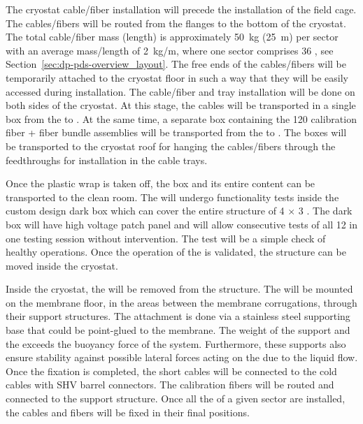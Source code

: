 The cryostat cable/fiber installation will precede the installation of the field cage. The cables/fibers will be routed from the flanges to the bottom of the cryostat. The total cable/fiber mass (length) is approximately \SI{50}{\kg} (\SI{25}{\m}) per sector with an average mass/length of \SI{2}{\kg/\m}, where one sector comprises \num{36} , see Section~\ref{sec:dp-pds-overview_layout}. The free ends of the cables/fibers will be temporarily attached to the cryostat floor in such a way that they will be easily accessed during installation. The cable/fiber and tray installation will be done on both sides of the cryostat. At this stage, the  cables will be transported in a single box from the  to \surf. At the same time, a separate box containing the \num{120} calibration fiber + fiber bundle assemblies will be transported from the  to \surf. The boxes will be transported to the cryostat roof for hanging the cables/fibers through the feedthroughs for installation in the cable trays.  

Once the plastic wrap is taken off, the   box and its entire content can be transported to the clean room. The  will undergo functionality tests inside the custom design dark box which can cover the entire structure of \num{4} $\times$ \num{3} . The dark box will have high voltage patch panel and will allow consecutive tests of all \num{12}  in one testing session without intervention. The test will be a simple check of healthy  operations. Once the operation of the  is validated, the structure can be moved inside the cryostat.

Inside the cryostat, the  will be removed from the structure. %
The  will be mounted on the membrane floor, in the areas between the membrane corrugations, through their support structures. The attachment is done via a stainless steel supporting base that could be point-glued to the membrane. The weight of the support and the  exceeds the buoyancy force of the system. Furthermore, these supports also ensure stability against possible lateral forces acting on the  due to the liquid flow. Once the fixation is completed, the short  cables will be connected to the cold  cables with SHV barrel connectors. The calibration fibers will be routed and connected to the support structure. Once all the  of a given  sector are installed, the cables and fibers will be fixed in their final positions.

